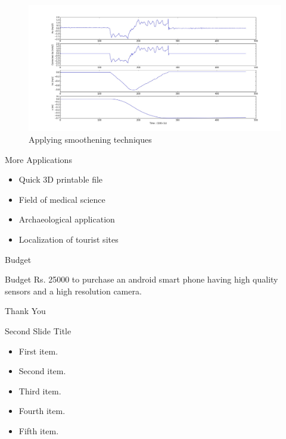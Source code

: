 \documentclass{beamer}
\begin{document}
\begin{frame}{}{}
  \begin{figure}[ht!]
    \centering
    \includegraphics[width=\linewidth]{Corrected.jpeg}
    \caption{Applying smoothening techniques}
  \end{figure}
\end{frame}

\begin{frame}{More Applications}{}
  \begin{itemize}
    \item Quick 3D printable file
    \item Field of medical science
    \item Archaeological application
    \item Localization of tourist sites
  \end{itemize}
\end{frame}

\begin{frame}{Budget}{}
\begin{block}{Budget}
Rs. 25000 to purchase an android smart phone having high quality sensors and a high resolution camera.
\end{block}
\end{frame}


\begin{frame}
\vfill
\begin{center}
\huge{Thank You}
\end{center}
\vfill
\end{frame}

\begin{frame}{Second Slide Title}
  \begin{itemize}
  \item {
    First item.
    \pause %
  }
  \item {   
    Second item.
  }
  \item<3-> {
    Third item.
  }
  \item<4-> {
    Fourth item.
  }
  \item<5-> {
    Fifth item. 
  }
  \end{itemize}
\end{frame}
\end{document}
